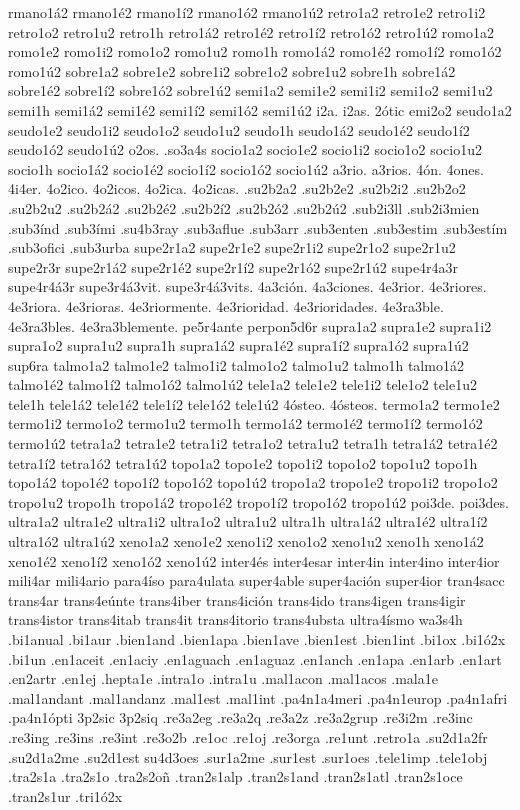 {rmano1á2 rmano1é2 rmano1í2 rmano1ó2 rmano1ú2
retro1a2 retro1e2 retro1i2 retro1o2 retro1u2 retro1h
retro1á2 retro1é2 retro1í2 retro1ó2 retro1ú2
romo1a2 romo1e2 romo1i2 romo1o2 romo1u2 romo1h
romo1á2 romo1é2 romo1í2 romo1ó2 romo1ú2
sobre1a2 sobre1e2 sobre1i2 sobre1o2 sobre1u2 sobre1h
sobre1á2 sobre1é2 sobre1í2 sobre1ó2 sobre1ú2
semi1a2 semi1e2 semi1i2 semi1o2 semi1u2 semi1h
semi1á2 semi1é2 semi1í2 semi1ó2 semi1ú2
i2a. i2as.
2ótic emi2o2
seudo1a2 seudo1e2 seudo1i2 seudo1o2 seudo1u2 seudo1h
seudo1á2 seudo1é2 seudo1í2 seudo1ó2 seudo1ú2
o2os.
.so3a4s
socio1a2 socio1e2 socio1i2 socio1o2 socio1u2 socio1h
socio1á2 socio1é2 socio1í2 socio1ó2 socio1ú2
a3rio. a3rios.
4ón. 4ones.
4i4er.
4o2ico. 4o2icos. 4o2ica. 4o2icas.
.su2b2a2 .su2b2e2 .su2b2i2 .su2b2o2 .su2b2u2
.su2b2á2 .su2b2é2 .su2b2í2 .su2b2ó2 .su2b2ú2
.sub2i3ll
.sub2i3mien
.sub3índ
.sub3ími
.su4b3ray
.sub3aflue
.sub3arr
.sub3enten
.sub3estim .sub3estím
.sub3ofici
.sub3urba
supe2r1a2 supe2r1e2 supe2r1i2 supe2r1o2 supe2r1u2 supe2r3r
supe2r1á2 supe2r1é2 supe2r1í2 supe2r1ó2 supe2r1ú2
supe4r4a3r supe4r4á3r
supe3r4á3vit. supe3r4á3vits.
4a3ción. 4a3ciones.
4e3rior. 4e3riores. 4e3riora. 4e3rioras. 4e3riormente.
4e3rioridad. 4e3rioridades.
4e3ra3ble. 4e3ra3bles. 4e3ra3blemente.
pe5r4ante
perpon5d6r
supra1a2 supra1e2 supra1i2 supra1o2 supra1u2 supra1h
supra1á2 supra1é2 supra1í2 supra1ó2 supra1ú2
sup6ra
talmo1a2 talmo1e2 talmo1i2 talmo1o2 talmo1u2 talmo1h
talmo1á2 talmo1é2 talmo1í2 talmo1ó2 talmo1ú2
tele1a2 tele1e2 tele1i2 tele1o2 tele1u2 tele1h
tele1á2 tele1é2 tele1í2 tele1ó2 tele1ú2
4ósteo. 4ósteos.
termo1a2 termo1e2 termo1i2 termo1o2 termo1u2 termo1h
termo1á2 termo1é2 termo1í2 termo1ó2 termo1ú2
tetra1a2 tetra1e2 tetra1i2 tetra1o2 tetra1u2 tetra1h
tetra1á2 tetra1é2 tetra1í2 tetra1ó2 tetra1ú2
topo1a2 topo1e2 topo1i2 topo1o2 topo1u2 topo1h
topo1á2 topo1é2 topo1í2 topo1ó2 topo1ú2
tropo1a2 tropo1e2 tropo1i2 tropo1o2 tropo1u2 tropo1h
tropo1á2 tropo1é2 tropo1í2 tropo1ó2 tropo1ú2
poi3de. poi3des.
ultra1a2 ultra1e2 ultra1i2 ultra1o2 ultra1u2 ultra1h
ultra1á2 ultra1é2 ultra1í2 ultra1ó2 ultra1ú2
xeno1a2 xeno1e2 xeno1i2 xeno1o2 xeno1u2 xeno1h
xeno1á2 xeno1é2 xeno1í2 xeno1ó2 xeno1ú2
inter4és
inter4esar
inter4in
inter4ino
inter4ior
mili4ar
mili4ario
para4íso
para4ulata
super4able
super4ación
super4ior
tran4sacc
trans4ar
trans4eúnte
trans4iber
trans4ición
trans4ido
trans4igen
trans4igir
trans4istor
trans4itab
trans4it
trans4itorio
trans4ubsta
ultra4ísmo
wa3s4h
.bi1anual
.bi1aur
.bien1and
.bien1apa
.bien1ave
.bien1est
.bien1int
.bi1ox
.bi1ó2x
.bi1un
.en1aceit
.en1aciy
.en1aguach
.en1aguaz
.en1anch
.en1apa
.en1arb
.en1art
.en2artr
.en1ej
.hepta1e
.intra1o
.intra1u
.mal1acon
.mal1acos
.mala1e
.mal1andant
.mal1andanz
.mal1est
.mal1int
.pa4n1a4meri
.pa4n1europ
.pa4n1afri
.pa4n1ópti
3p2sic
3p2siq
.re3a2eg
.re3a2q
.re3a2z
.re3a2grup
.re3i2m
.re3inc
.re3ing
.re3ins
.re3int
.re3o2b
.re1oc
.re1oj
.re3orga
.re1unt
.retro1a
.su2d1a2fr
.su2d1a2me
.su2d1est
su4d3oes
.sur1a2me
.sur1est
.sur1oes
.tele1imp
.tele1obj
.tra2s1a
.tra2s1o
.tra2s2oñ
.tran2s1alp
.tran2s1and
.tran2s1atl
.tran2s1oce
.tran2s1ur
.tri1ó2x
}
